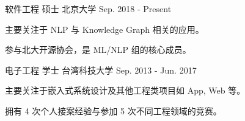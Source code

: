 

\begin{cventries}

  \cventry
    {软件工程 硕士} %
    {北京大学} %
    {} %
    {Sep. 2018 - Present} %
    {
      \begin{cvitems} %
        \item {主要关注于 NLP 与 Knowledge Graph 相关的应用。}
        \item {参与北大开源协会，是 ML/NLP 组的核心成员。}
      \end{cvitems}
    }

  \cventry
    {电子工程 学士} %
    {台湾科技大学} %
    {} %
    {Sep. 2013 - Jun. 2017} %
    {
      \begin{cvitems} %
        \item {主要关注于嵌入式系统设计及其他工程类项目如 App, Web 等。}
        \item {拥有 4 次个人接案经验与参加 5 次不同工程领域的竞赛。}
      \end{cvitems}
    }

\end{cventries}
